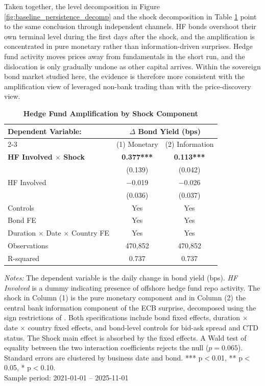 \documentclass[english, 11pt, oneside]{article}
\begin{document}
Taken together, the level decomposition in Figure \ref{fig:baseline_persistence_decomp} and the shock decomposition in Table \ref{tab:jk} point to the same conclusion through independent channels. HF bonds overshoot their own terminal level during the first days after the shock, and the amplification is concentrated in pure monetary rather than information-driven surprises. Hedge fund activity moves prices away from fundamentals in the short run, and the dislocation is only gradually undone as other capital arrives. Within the sovereign bond market studied here, the evidence is therefore more consistent with the amplification view of leveraged non-bank trading than with the price-discovery view.

\begin{table}[t]
\centering
\caption{\textbf{Hedge Fund Amplification by Shock Component}}
\footnotesize
\setlength{\tabcolsep}{10pt}
\renewcommand{\arraystretch}{1.1}
\begin{tabular}{l c c}
\toprule
\textbf{Dependent Variable:} & \multicolumn{2}{c}{\textbf{$\Delta$ Bond Yield (bps)}} \\
\cmidrule(lr){2-3}
 & (1) Monetary & (2) Information \\
\midrule
\textbf{HF Involved $\times$ Shock} & \textbf{0.377***} & \textbf{0.113***} \\
 & (0.139) & (0.042) \\
\addlinespace
HF Involved & $-$0.019 & $-$0.026 \\
 & (0.036) & (0.037) \\
\midrule
Controls & Yes & Yes \\
Bond FE & Yes & Yes \\
Duration $\times$ Date $\times$ Country FE & Yes & Yes \\
\midrule
Observations & 470,852 & 470,852 \\
R-squared & 0.737 & 0.737 \\
\bottomrule
\end{tabular}
\label{tab:jk}

\vspace{1ex}
\begin{minipage}{\textwidth}
\scriptsize
\textit{Notes:} The dependent variable is the daily change in bond yield (bps). \textit{HF Involved} is a dummy indicating presence of offshore hedge fund repo activity. The shock in Column (1) is the pure monetary component and in Column (2) the central bank information component of the ECB surprise, decomposed using the sign restrictions of \citet{jarocinski2020}. Both specifications include bond fixed effects, duration $\times$ date $\times$ country fixed effects, and bond-level controls for bid-ask spread and CTD status. The Shock main effect is absorbed by the fixed effects. A Wald test of equality between the two interaction coefficients rejects the null ($p = 0.065$). Standard errors are clustered by business date and bond. *** p$<$0.01, ** p$<$0.05, * p$<$0.10. \\ Sample period: 2021-01-01 -- 2025-11-01
\end{minipage}
\end{table}
\end{document}

